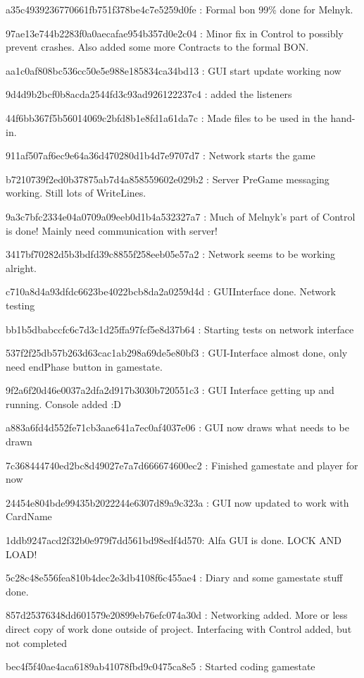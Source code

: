 a35c4939236770661fb751f378be4c7e5259d0fe : Formal bon 99\% done for Melnyk.

97ae13e744b2283f0a0aecafae954b357d0e2c04 : Minor fix in Control to possibly prevent crashes. Also added some more Contracts to the formal BON.

aa1c0af808bc536cc50e5e988e185834ca34bd13 : GUI start update working now

9d4d9b2bcf0b8acda2544fd3c93ad926122237c4 : added the listeners

44f6bb367f5b56014069c2bfd8b1e8fd1a61da7c : Made files to be used in the hand-in.

911af507af6ec9e64a36d470280d1b4d7e9707d7 : Network starts the game

b7210739f2ed0b37875ab7d4a858559602e029b2 : Server PreGame messaging working. Still lots of WriteLines.

9a3c7bfc2334e04a0709a09eeb0d1b4a532327a7 : Much of Melnyk's part of Control is done! Mainly need communication with server!

3417bf70282d5b3bdfd39c8855f258eeb05e57a2 : Network seems to be working alright.

c710a8d4a93dfdc6623be4022bcb8da2a0259d4d : GUIInterface done. Network testing

bb1b5dbabccfc6c7d3c1d25ffa97fcf5e8d37b64 : Starting tests on network interface

537f2f25db57b263d63cac1ab298a69de5e80bf3 : GUI-Interface almost done, only need endPhase button in gamestate.

9f2a6f20d46e0037a2dfa2d917b3030b720551c3 : GUI Interface getting up and running. Console added :D

a883a6fd4d552fe71cb3aae641a7ec0af4037e06 : GUI now draws what needs to be drawn

7c368444740ed2bc8d49027e7a7d666674600ec2 : Finished gamestate and player for now

24454e804bde99435b2022244e6307d89a9c323a : GUI now updated to work with CardName

1ddb9247acd2f32b0e979f7dd561bd98edf4d570: Alfa GUI is done. LOCK AND LOAD!

5c28c48e556fea810b4dec2e3db4108f6c455ae4 : Diary and some gamestate stuff done.

857d25376348dd601579e20899eb76efc074a30d : Networking added. More or less direct copy of work done outside of project. Interfacing with Control added, but not completed

bec4f5f40ae4aca6189ab41078fbd9c0475ca8e5 : Started coding gamestate

